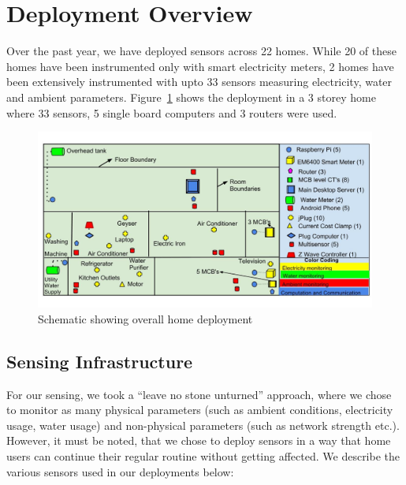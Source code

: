 \documentclass[10pt]{sensys-proc}
\newcommand{\figref}[1]{Figure~\ref{#1}}
\begin{document}
\section{Deployment Overview}
Over the past year, we have deployed sensors across 22 homes. While 20 of these homes have been instrumented only with smart electricity meters, 2 homes have been extensively instrumented with upto 33 sensors measuring electricity, water and ambient parameters. \figref{fig:overall} shows the deployment in a 3 storey home where 33 sensors, 5 single board computers and 3 routers were used. 
\begin{figure}     
    \includegraphics[scale=0.2]{./figures/overall_deployment.jpg}    
    \caption{Schematic showing overall home deployment}   
    \label{fig:overall}
   
\end{figure}
\subsection{Sensing Infrastructure}
\label{sec:sensing}
For our sensing, we took a ``leave no stone unturned'' approach, where  we chose to monitor as many physical parameters (such as ambient conditions, electricity usage, water usage) and non-physical parameters (such as network strength etc.). However, it must be noted, that we chose to deploy sensors in a way that home users can continue their regular routine without getting affected. We describe the various sensors used in our deployments below:
\end{document}
